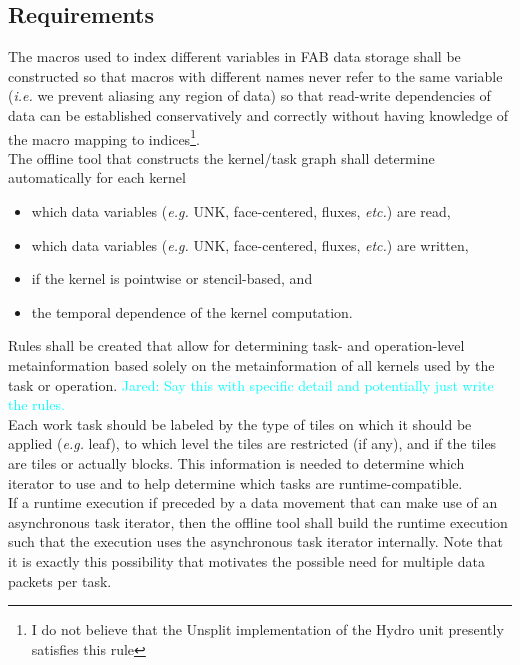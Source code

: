 \documentclass{article}
\newcommand{\Jared}[1]          {\textcolor{cyan}{Jared: #1}}
\begin{document}
\subsection{Requirements}

The macros used to index different variables in FAB data storage shall be
constructed so that macros with different names never refer to the same
variable (\textit{i.e.} we prevent aliasing any region of data) so that
read-write dependencies of data can be established conservatively and correctly
without having knowledge of the macro mapping to indices\footnote{I do not
believe that the Unsplit implementation of the Hydro unit presently satisfies
this rule}.\\

The offline tool that constructs the kernel/task graph shall determine
automatically for each kernel
\begin{itemize}
\item{which data variables (\textit{e.g.} UNK, face-centered, fluxes,
\textit{etc.}) are read,}
\item{which data variables (\textit{e.g.} UNK, face-centered, fluxes,
\textit{etc.}) are written,}
\item{if the kernel is pointwise or stencil-based, and}
\item{the temporal dependence of the kernel computation.}
\end{itemize}

Rules shall be created that allow for determining task- and operation-level
metainformation based solely on the metainformation of all kernels used by the
task or operation.  \Jared{Say this with specific detail and
potentially just write the rules.}\\

Each work task should be labeled by the type of tiles on which it should be
applied (\textit{e.g.} leaf), to which level the tiles are restricted (if any),
and if the tiles are tiles or actually blocks.  This information is needed to
determine which iterator to use and to help determine which tasks are
runtime-compatible.\\

If a runtime execution if preceded by a data movement that can make use of an
asynchronous task iterator, then the offline tool shall build the runtime
execution such that the execution uses the asynchronous task iterator
internally.  Note that it is exactly this possibility that motivates the
possible need for multiple data packets per task.
\end{document}
